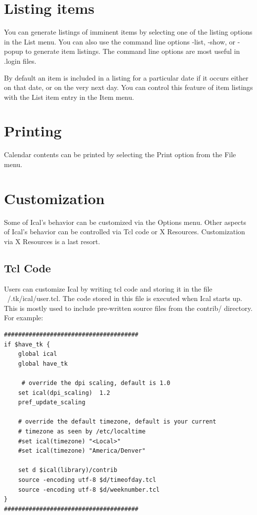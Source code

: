 \documentclass[a4paper,english]{article}
\begin{document}
\section{Listing items}
    You can generate listings of imminent items by selecting one of
    the listing options in the List menu.  You can also use the
    command line options -list, -show, or -popup to generate item
    listings.  The command line options are most useful in .login
    files.

    By default an item is included in a listing for a particular date
    if it occurs either on that date, or on the very next day.  You
    can control this feature of item listings with the List item entry
    in the Item menu.

\section{Printing}
    Calendar contents can be printed by selecting the Print option
    from the File menu.

\section{Customization}

    Some of Ical's behavior can be customized via the Options menu.
    Other aspects of Ical's behavior can be controlled via Tcl code or
    X Resources. Customization via X Resources is a last resort.

    \subsection{Tcl Code}
        Users can customize Ical by writing tcl code and storing
        it in the file ~/.tk/ical/user.tcl.  The code stored in this
        file is executed when Ical starts up. This is mostly used
        to include pre-written source files from the contrib/ directory.
        For example:

\begin{verbatim}
######################################
if $have_tk {
    global ical
    global have_tk

     # override the dpi scaling, default is 1.0
    set ical(dpi_scaling)  1.2
    pref_update_scaling

    # override the default timezone, default is your current
    # timezone as seen by /etc/localtime
    #set ical(timezone) "<Local>"
    #set ical(timezone) "America/Denver"

    set d $ical(library)/contrib
    source -encoding utf-8 $d/timeofday.tcl
    source -encoding utf-8 $d/weeknumber.tcl
}
######################################
\end{verbatim}
\end{document}
